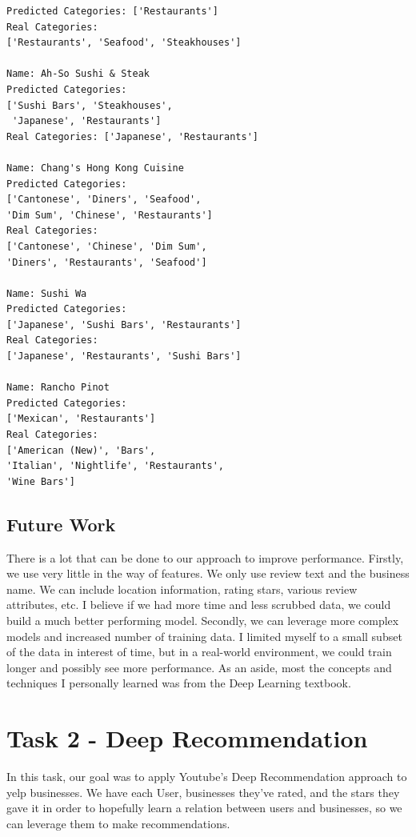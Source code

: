 \documentclass{article}
\begin{document}
\begin{verbatim}
Predicted Categories: ['Restaurants']
Real Categories: 
['Restaurants', 'Seafood', 'Steakhouses']

Name: Ah-So Sushi & Steak
Predicted Categories: 
['Sushi Bars', 'Steakhouses',
 'Japanese', 'Restaurants']
Real Categories: ['Japanese', 'Restaurants']

Name: Chang's Hong Kong Cuisine
Predicted Categories: 
['Cantonese', 'Diners', 'Seafood', 
'Dim Sum', 'Chinese', 'Restaurants']
Real Categories: 
['Cantonese', 'Chinese', 'Dim Sum', 
'Diners', 'Restaurants', 'Seafood']

Name: Sushi Wa
Predicted Categories: 
['Japanese', 'Sushi Bars', 'Restaurants']
Real Categories: 
['Japanese', 'Restaurants', 'Sushi Bars']

Name: Rancho Pinot
Predicted Categories: 
['Mexican', 'Restaurants']
Real Categories: 
['American (New)', 'Bars', 
'Italian', 'Nightlife', 'Restaurants', 
'Wine Bars']
\end{verbatim}

\subsection*{Future Work}

There is a lot that can be done to our approach to improve performance. Firstly, we use very little in the way of features. We only use review text and the business name. We can include location information, rating stars, various review attributes, etc. I believe if we had more time and less scrubbed data, we could build a much better performing model. Secondly, we can leverage more complex models and increased number of training data. I limited myself to a small subset of the data in interest of time, but in a real-world environment, we could train longer and possibly see more performance. As an aside, most the concepts and techniques I personally learned was from the Deep Learning \cite{Goodfellow-et-al-2016} textbook. 

\pagebreak

\section*{Task 2 - Deep Recommendation}

In this task, our goal was to apply Youtube's Deep Recommendation approach \cite{youtubedeep} to yelp businesses. We have each User, businesses they've rated, and the stars they gave it in order to hopefully learn a relation between users and businesses, so we can leverage them to make recommendations. 
\end{document}
